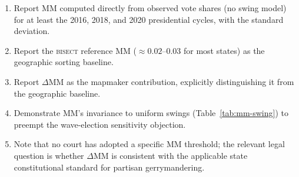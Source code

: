 \begin{enumerate}
\item Report MM computed directly from observed vote shares (no swing model) for
  at least the 2016, 2018, and 2020 presidential cycles, with the standard deviation.
\item Report the \textsc{bisect} reference MM ($\approx 0.02$--$0.03$ for most states)
  as the geographic sorting baseline.
\item Report $\Delta\text{MM}$ as the mapmaker contribution, explicitly distinguishing
  it from the geographic baseline.
\item Demonstrate MM's invariance to uniform swings (Table~\ref{tab:mm-swing}) to
  preempt the wave-election sensitivity objection.
\item Note that no court has adopted a specific MM threshold; the relevant legal
  question is whether $\Delta\text{MM}$ is consistent with the applicable state
  constitutional standard for partisan gerrymandering.
\end{enumerate}
